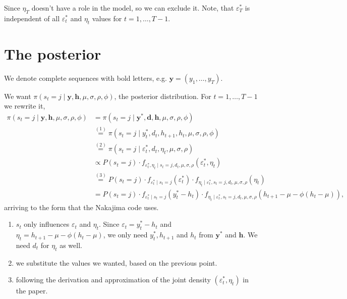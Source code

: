 \documentclass{article}
\begin{document}
Since $\eta_T$ doesn't have a role in the model, so we can exclude it. Note, that $\varepsilon^*_T$ is independent of all $\varepsilon^*_t$ and $\eta_t$ values for $t=1,\dots,T-1$. 

\section{The posterior}

We denote complete sequences with bold letters, e.g. $\bm{y}=(y_1,\dots,y_T)$.

We want $\pi(s_t=j\mid\bm{y},\bm{h},\mu,\sigma,\rho,\phi)$, the posterior distribution. For $t=1,\dots,T-1$ we rewrite it,
\begin{align*}
\pi(s_t=j\mid\bm{y},\bm{h},\mu,\sigma,\rho,\phi)
&= \pi(s_t=j\mid\bm{y^*},\bm{d},\bm{h},\mu,\sigma,\rho,\phi) \\
&\overset{(1)}{=} \pi(s_t=j\mid y^*_t,d_t,h_{t+1},h_t,\mu,\sigma,\rho,\phi) \\
&\overset{(2)}{=} \pi(s_t=j\mid \varepsilon^*_t,d_t,\eta_t,\mu,\sigma,\rho) \\
&\propto P(s_t=j)\cdot f_{\varepsilon^*_t,\eta_t\mid s_t=j,d_t,\mu,\sigma,\rho}(\varepsilon^*_t,\eta_t) \\
&\overset{(3)}{=} P(s_t=j)\cdot f_{\varepsilon^*_t\mid s_t=j}(\varepsilon^*_t)\cdot f_{\eta_t\mid \varepsilon^*_t,s_t=j,d_t,\mu,\sigma,\rho}(\eta_t) \\
&= P(s_t=j)\cdot f_{\varepsilon^*_t\mid s_t=j}(y^*_t-h_t)\cdot f_{\eta_t\mid \varepsilon^*_t,s_t=j,d_t,\mu,\sigma,\rho}(h_{t+1}-\mu-\phi(h_t-\mu)),
\end{align*}
arriving to the form that the Nakajima code uses.

\begin{enumerate}[(1)]
    \item $s_t$ only influences $\varepsilon_t$ and $\eta_t$. Since $\varepsilon_t=y^*_t-h_t$ and $\eta_t=h_{t+1}-\mu-\phi(h_t-\mu)$, we only need $y^*_t, h_{t+1}$ and $h_t$ from $\bm{y^*}$ and $\bm{h}$. We need $d_t$ for $\eta_t$ as well.
    \item we substitute the values we wanted, based on the previous point.
    \item following the derivation and approximation of the joint density $(\varepsilon^*_t,\eta_t)$ in the paper.
\end{enumerate}
\end{document}
